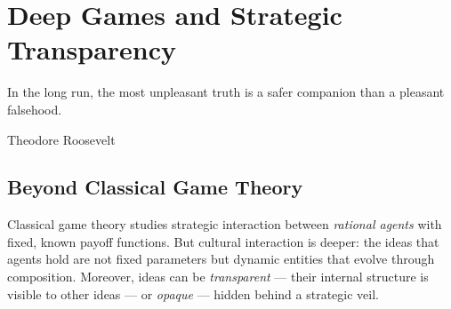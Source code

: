 \begin{center}
\end{center}



\chapter{Deep Games and Strategic Transparency}
\label{ch:deepgames}

\epigraph{In the long run, the most unpleasant truth is a safer companion
than a pleasant falsehood.}{Theodore Roosevelt}

\section{Beyond Classical Game Theory}

Classical game theory studies strategic interaction between \emph{rational
agents} with fixed, known payoff functions.  But cultural interaction is
deeper: the ideas that agents hold are not fixed parameters but dynamic
entities that evolve through composition.  Moreover, ideas can be
\emph{transparent} --- their internal structure is visible to other ideas ---
or \emph{opaque} --- hidden behind a strategic veil.

